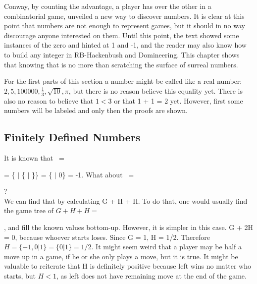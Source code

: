 
Conway, by counting the advantage, a player has over the other in a combinatorial game, unveiled a new way to discover numbers. It is clear at this point that numbers are not enough to represent games, but it should in no way discourage anyone interested on them. Until this point, the text showed some instances of the zero and hinted at 1 and -1, and the reader may also know how to build any integer in RB-Hackenbush and Domineering. This chapter shows that knowing that is no more than scratching the surface of surreal numbers.

For the first parts of this section a number  might be called like a real number: $2, 5, 100000, \frac{1}{3}, \sqrt{10}, \pi$, but there is no reason believe this equality yet. There is also no reason to believe that $1 < 3$ or that 1 + 1 = 2 yet. However, first some numbers will be labeled and only then the proofs are shown.


\subsection*{Finitely Defined Numbers}

It is known that \Gm\ =
 = \{ $|$ \{ $|$ \}\} = \{ $|$ 0\} = -1.
What about \Hm\ =  ?\\


We can find that by calculating G + H + H. To do that, one would usually find the game tree of 
$G + H + H = $
, and fill the known values bottom-up. However, it is simpler in this case. G + 2H = 0, because whoever starts loses. Since G = 1, H = 1/2. Therefore $H = \{-1, 0 | 1\} = \{0 | 1\} = 1/2$. It might seem weird that a player may be half a move up in a game, if he or she only plays a move, but it is true. It might be valuable to reiterate that H is definitely positive because left wins no matter who starts, but $H < 1$, as left does not have remaining move at the end of the game.

